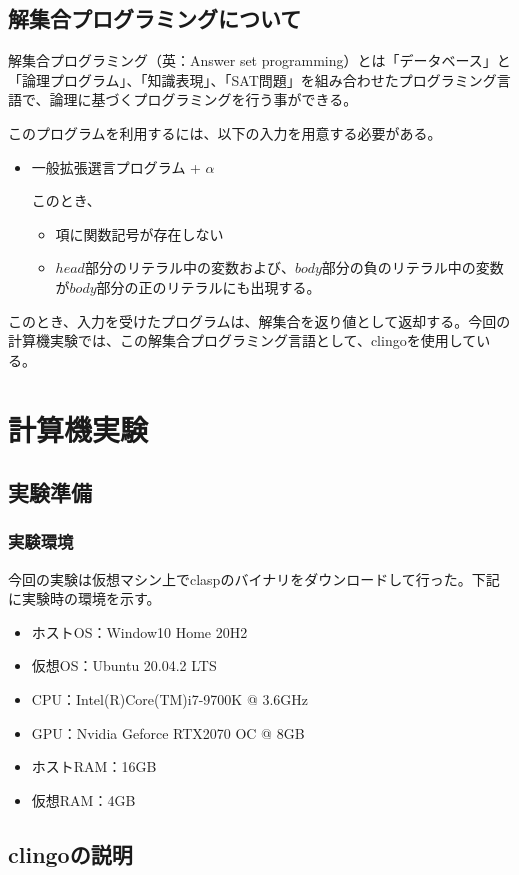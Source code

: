 \documentclass[dvipdfmx]{jsarticle}
\begin{document}
\subsection{解集合プログラミングについて}
解集合プログラミング（英：Answer set programming）とは「データベース」と「論理プログラム」、「知識表現」、「SAT問題」を組み合わせたプログラミング言語で、論理に基づくプログラミングを行う事ができる。\par
このプログラムを利用するには、以下の入力を用意する必要がある。
\begin{itemize}
  \item 一般拡張選言プログラム + $\alpha$\par
  このとき、
  \begin{itemize}
    \item 項に関数記号が存在しない
    \item $head$部分のリテラル中の変数および、$body$部分の負のリテラル中の変数が$body$部分の正のリテラルにも出現する。
  \end{itemize}
\end{itemize}
このとき、入力を受けたプログラムは、解集合を返り値として返却する。今回の計算機実験では、この解集合プログラミング言語として、clingoを使用している。
\section{計算機実験}
\subsection{実験準備}
  \subsubsection{実験環境}
  今回の実験は仮想マシン上でclaspのバイナリをダウンロードして行った。下記に実験時の環境を示す。
  \begin{itemize}
    \item ホストOS：Window10 Home 20H2
    \item 仮想OS：Ubuntu 20.04.2 LTS
    \item CPU：Intel(R)Core(TM)i7-9700K @ 3.6GHz
    \item GPU：Nvidia Geforce RTX2070 OC @ 8GB
    \item ホストRAM：16GB
    \item 仮想RAM：4GB
  \end{itemize}
\subsection{clingoの説明}
\end{document}
